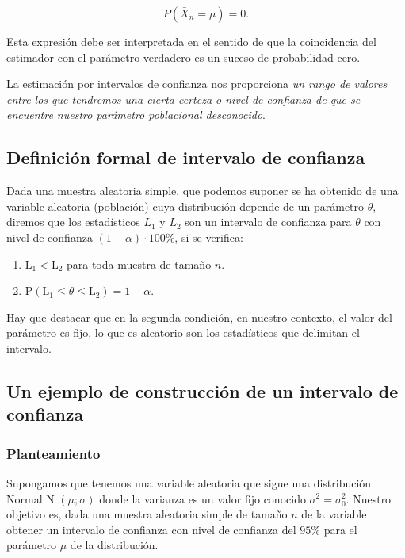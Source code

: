 \documentclass[
]{article}
\providecommand{\tightlist}{%
  \setlength{\itemsep}{0pt}\setlength{\parskip}{0pt}}
\begin{document}
\[
P\left(\bar{X}_{n}=\mu\right)=0.
\]

Esta expresión debe ser interpretada en el sentido de que la coincidencia del estimador con el parámetro verdadero es un suceso de probabilidad cero.

La estimación por intervalos de confianza nos proporciona \emph{un rango de valores entre los que tendremos una cierta certeza o nivel de confianza de que se encuentre nuestro parámetro poblacional desconocido}.

\subsection{Definición formal de intervalo de confianza}\label{definiciuxf3n-formal-de-intervalo-de-confianza}

Dada una muestra aleatoria simple, que podemos suponer se ha obtenido de una variable aleatoria (población) cuya distribución depende de un parámetro \(\theta\), diremos que los estadísticos \(L_{1}\) y \(L_{2}\) son un intervalo de confianza para \(\theta\) con nivel de confianza \((1-\alpha) \cdot 100 \%\), si se verifica:

\begin{enumerate}
\def\labelenumi{\arabic{enumi}.}
\tightlist
\item
  \(\mathrm{L}_{1}<\mathrm{L}_{2}\) para toda muestra de tamaño \(n\).
\item
  \(\mathrm{P}\left(\mathrm{L}_{1} \leq \theta \leq \mathrm{L}_{2}\right)=1-\alpha\).
\end{enumerate}

Hay que destacar que en la segunda condición, en nuestro contexto, el valor del parámetro es fijo, lo que es aleatorio son los estadísticos que delimitan el intervalo.

\subsection{Un ejemplo de construcción de un intervalo de confianza}\label{un-ejemplo-de-construcciuxf3n-de-un-intervalo-de-confianza}

\subsubsection{Planteamiento}\label{planteamiento}

Supongamos que tenemos una variable aleatoria que sigue una distribución Normal N \((\mu ; \sigma)\) donde la varianza es un valor fijo conocido \(\sigma^{2}=\sigma^2_0\). Nuestro objetivo es, dada una muestra aleatoria simple de tamaño \(n\) de la variable obtener un intervalo de confianza con nivel de confianza del \(95 \%\) para el parámetro \(\mu\) de la distribución.
\end{document}
